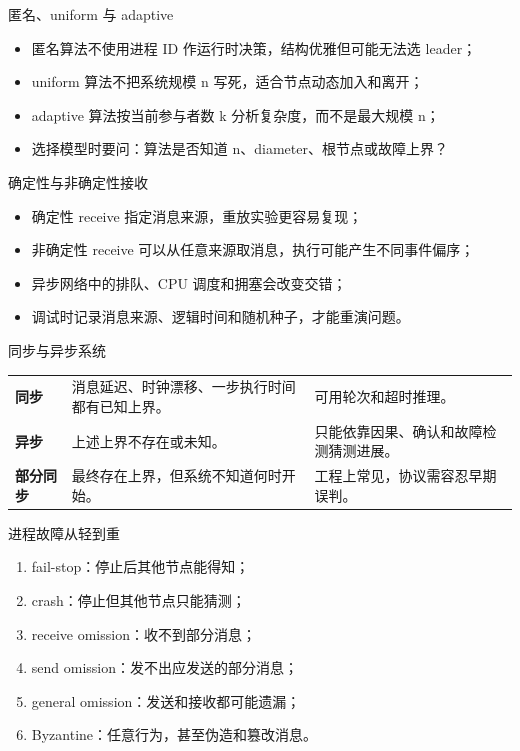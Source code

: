 \documentclass[UTF8,fontset=none,aspectratio=169,10pt]{beamer}
\begin{document}
\begin{frame}{匿名、uniform 与 adaptive}
\begin{itemize}
  \item 匿名算法不使用进程 ID 作运行时决策，结构优雅但可能无法选 leader；
  \item uniform 算法不把系统规模 n 写死，适合节点动态加入和离开；
  \item adaptive 算法按当前参与者数 k 分析复杂度，而不是最大规模 n；
  \item 选择模型时要问：算法是否知道 n、diameter、根节点或故障上界？
\end{itemize}
\end{frame}

\begin{frame}{确定性与非确定性接收}
\begin{itemize}
  \item 确定性 receive 指定消息来源，重放实验更容易复现；
  \item 非确定性 receive 可以从任意来源取消息，执行可能产生不同事件偏序；
  \item 异步网络中的排队、CPU 调度和拥塞会改变交错；
  \item 调试时记录消息来源、逻辑时间和随机种子，才能重演问题。
\end{itemize}
\end{frame}


\begin{frame}{同步与异步系统}
\begin{tabularx}{\linewidth}{>{\bfseries}p{3cm}XX}
\toprule
同步 & 消息延迟、时钟漂移、一步执行时间都有已知上界。 & 可用轮次和超时推理。 \\
异步 & 上述上界不存在或未知。 & 只能依靠因果、确认和故障检测猜测进展。 \\
部分同步 & 最终存在上界，但系统不知道何时开始。 & 工程上常见，协议需容忍早期误判。 \\
\bottomrule
\end{tabularx}
\end{frame}

\begin{frame}{进程故障从轻到重}
\begin{enumerate}
  \item fail-stop：停止后其他节点能得知；
  \item crash：停止但其他节点只能猜测；
  \item receive omission：收不到部分消息；
  \item send omission：发不出应发送的部分消息；
  \item general omission：发送和接收都可能遗漏；
  \item Byzantine：任意行为，甚至伪造和篡改消息。
\end{enumerate}
\end{frame}
\end{document}
